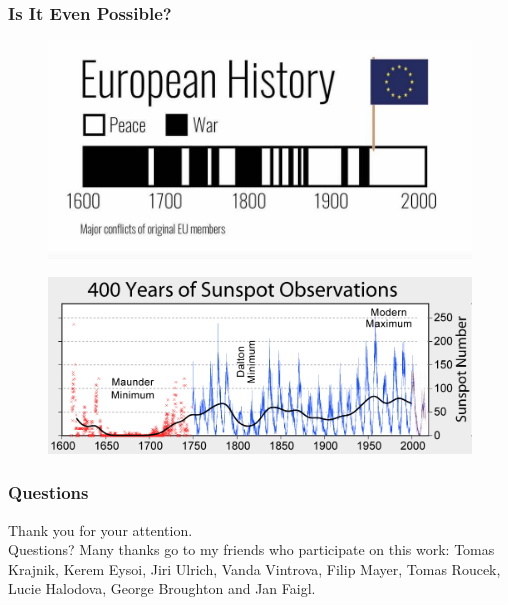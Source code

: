 \begin{frame}
	\frametitle{Is It Even Possible?}
    \vspace{3mm}
\begin{figure}[!b]
      \includegraphics[width=0.6\columnwidth]{fig/wars.jpg}
\end{figure}
\begin{figure}[!b]
    \hspace{5mm}
      \includegraphics[width=0.6\columnwidth]{fig/Sunspot_Numbers.png}
\end{figure}
\end{frame}


\begin{frame}
	\frametitle{Questions}
	\begin{center}
		\vfill
		Thank you for your attention.\\
		\vfill
		Questions?
		\vfill
		\vfill
		\vfill
Many thanks go to my friends who participate on this work: Tomas Krajnik, Kerem Eysoi, Jiri Ulrich, Vanda Vintrova, Filip Mayer, Tomas Roucek, Lucie Halodova, George Broughton and Jan Faigl.
	\end{center}
\end{frame}




